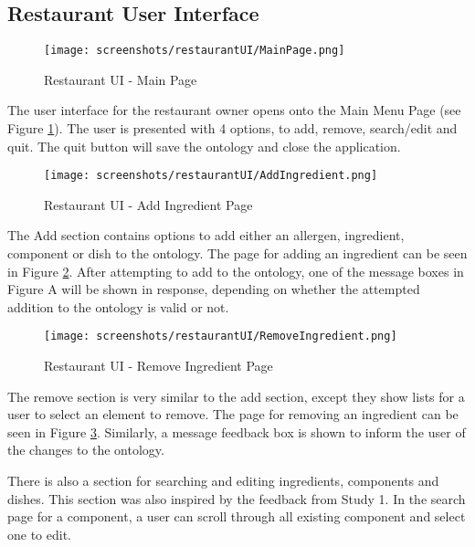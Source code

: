 \subsection{Restaurant User Interface}

\begin{figure}[h]
    \centering
    \captionsetup{justification=centering}
    \texttt{[image: screenshots/restaurantUI/MainPage.png]}
    \caption{Restaurant UI - Main Page}
    \label{fig:restaurantUI_main_page}
\end{figure}

The user interface for the restaurant owner opens onto the Main Menu Page (see Figure \ref{fig:restaurantUI_main_page}). The user is presented with 4 options, to add, remove, search/edit and quit. The quit button will save the ontology and close the application.

\begin{figure}[h]
    \centering
    \captionsetup{justification=centering}
    \texttt{[image: screenshots/restaurantUI/AddIngredient.png]}
    \caption{Restaurant UI - Add Ingredient Page}
    \label{fig:restaurantUI_add_ing_page}
\end{figure}

The Add section contains options to add either an allergen, ingredient, component or dish to the ontology. The page for adding an ingredient can be seen in Figure \ref{fig:restaurantUI_add_ing_page}. After attempting to add to the ontology, one of the message boxes in Figure A will be shown in response, depending on whether the attempted addition to the ontology is valid or not.

\begin{figure}[h]
    \centering
    \captionsetup{justification=centering}
    \texttt{[image: screenshots/restaurantUI/RemoveIngredient.png]}
    \caption{Restaurant UI - Remove Ingredient Page}
    \label{fig:restaurantUI_remove_ing_page}
\end{figure}

The remove section is very similar to the add section, except they show lists for a user to select an element to remove. The page for removing an ingredient can be seen in Figure \ref{fig:restaurantUI_remove_ing_page}. Similarly, a message feedback box is shown to inform the user of the changes to the ontology.

There is also a section for searching and editing ingredients, components and dishes. This section was also inspired by the feedback from Study 1. In the search page for a component, a user can scroll through all existing component and select one to edit.

